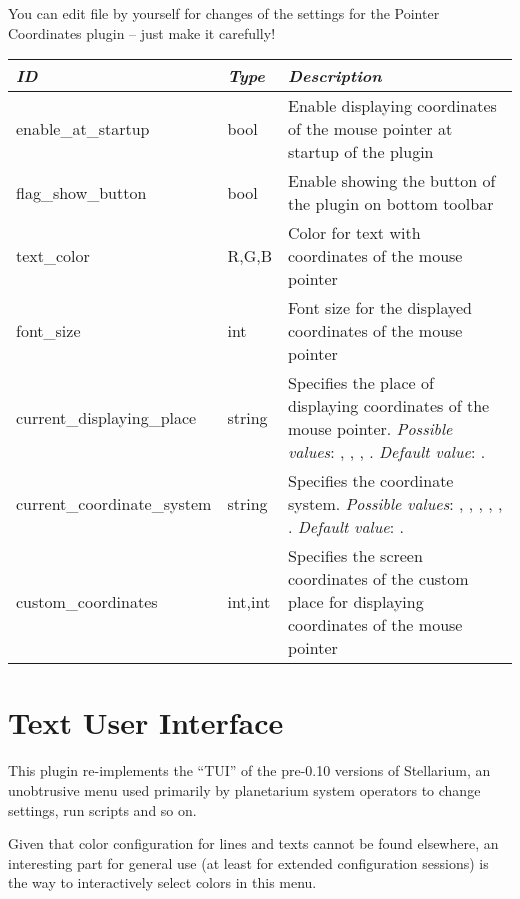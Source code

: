 You can edit  file by yourself for changes of the
settings for the Pointer Coordinates plugin -- just make it carefully!

\begin{longtabu} to \textwidth {l|l|X}\toprule
\emph{ID}            & \emph{Type} & \emph{Description}\\\midrule
enable\_at\_startup  & bool & Enable displaying coordinates of the mouse pointer at startup of the plugin\\\midrule
flag\_show\_button   & bool & Enable showing the button of the plugin on bottom toolbar\\\midrule
text\_color          & R,G,B & Color for text with coordinates of the mouse pointer \\\midrule
font\_size           & int & Font size for the displayed coordinates of the mouse pointer \\\midrule
current\_displaying\_place  & string & Specifies the place of displaying coordinates of the mouse pointer. \textit{Possible values}: , , , . \textit{Default value}: . \\\midrule
current\_coordinate\_system & string & Specifies the coordinate system. \textit{Possible values}: , , , , , . \textit{Default value}: . \\\midrule
custom\_coordinates  & int,int & Specifies the screen coordinates of the custom place for displaying coordinates of the mouse pointer \\\bottomrule
\end{longtabu}




\newpage

\section{Text User Interface}
\label{sec:plugins:TextUserInterface}


This plugin re-implements the ``TUI'' of the pre-0.10 versions of
Stellarium, an unobtrusive menu used primarily by planetarium system
operators to change settings, run scripts and so on.

Given that color configuration for lines and texts cannot be found
elsewhere, an interesting part for general use (at least for extended
configuration sessions) is the way to interactively select colors in
this menu.

